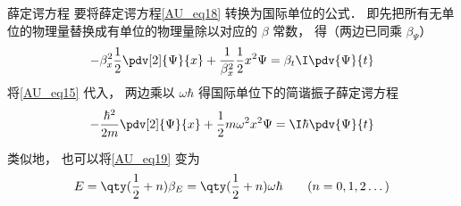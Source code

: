 \begin{example}{薛定谔方程}
要将薛定谔方程\autoref{AU_eq18} 转换为国际单位的公式． 即先把所有无单位的物理量替换成有单位的物理量除以对应的 $\beta$ 常数， 得（两边已同乘 $\beta_\Psi$）
\begin{equation}
-\beta_x^2\frac12 \pdv[2]{\Psi}{x} + \frac{1}{\beta_x^2}\frac12 x^2 \Psi= \beta_t\I\pdv{\Psi}{t}
\end{equation}
将\autoref{AU_eq15} 代入， 两边乘以 $\omega\hbar$ 得国际单位下的简谐振子薛定谔方程
\begin{equation}
-\frac{\hbar^2}{2m} \pdv[2]{\Psi}{x} + \frac12 m\omega^2 x^2 \Psi= \I\hbar\pdv{\Psi}{t}
\end{equation}

类似地， 也可以将\autoref{AU_eq19} 变为
\begin{equation}
E =  \qty(\frac12 + n)\beta_E = \qty(\frac12 + n)\omega\hbar \qquad (n = 0, 1, 2\dots)
\end{equation}
\end{example}
